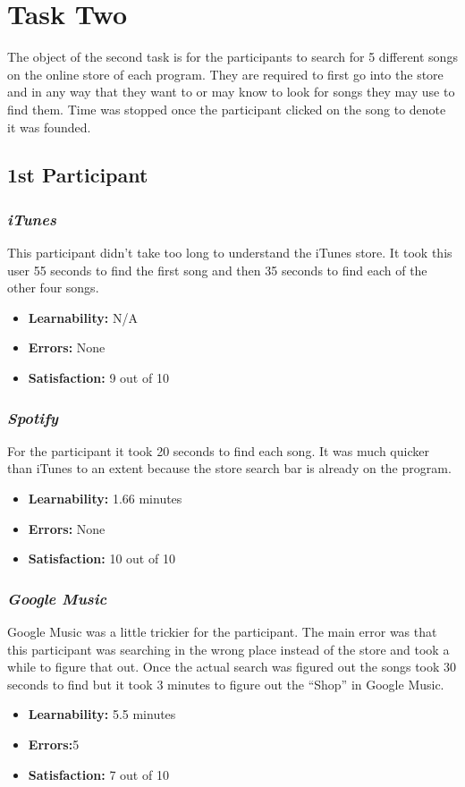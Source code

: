 \documentclass{article}
\begin{document}
\section{Task Two}
The object of the second task is for the participants to search for 5 different songs on the online store of each program. They are required to first go into the store and in any way that they want to or may know to look for songs they may use to find them. Time was stopped once the participant clicked on the song to denote it was founded. 

\begin{multicols}{2}
\subsection{1st Participant}

\subsubsection{\it iTunes}
This participant didn’t take too long to understand the iTunes store. It took this user 55 seconds to find the first song and then 35 seconds to find each of the other four songs. 
\begin{itemize}
	\item {\bf Learnability:} N/A
	\item {\bf Errors:}  None
	\item {\bf Satisfaction:} 9 out of 10 
\end{itemize}

\subsubsection{\it Spotify}
For the participant it took 20 seconds to find each song. It was much quicker than iTunes to an extent because the store search bar is already on the program.
\begin{itemize}
	\item {\bf Learnability:} 1.66 minutes
	\item {\bf Errors:} None
	\item {\bf Satisfaction:} 10 out of 10 
\end{itemize}

\subsubsection{\it Google Music}
Google Music was a little trickier for the participant. The main error was that this participant was searching in the wrong place instead of the store and took a while to figure that out. Once the actual search was figured out the songs took 30 seconds to find but it took 3 minutes to figure out the “Shop” in Google Music.
\begin{itemize}
\item {\bf Learnability:} 5.5 minutes
	\item {\bf Errors:}5
	\item {\bf Satisfaction:} 7 out of 10 
\end{itemize} 


\end{multicols}
\end{document}
